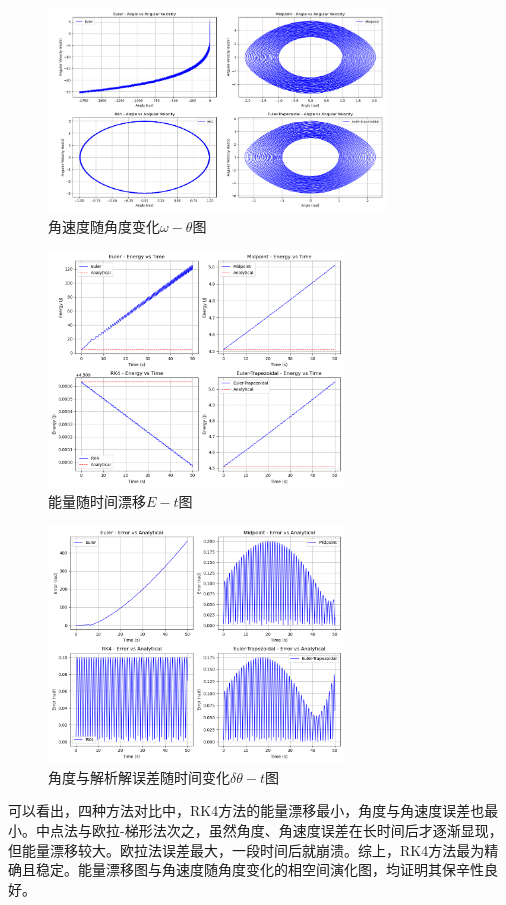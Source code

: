 \begin{figure}[H]
    \centering
    \includegraphics[width=0.8\textwidth]{Problem_1/figs/angle_velocity_angle.png}
    \caption{角速度随角度变化$\omega - \theta $图}
\end{figure}
\begin{figure}[H]
    \centering
    \includegraphics[width=0.7\textwidth]{Problem_1/figs/energy_time.png}
    \caption{能量随时间漂移$E - t $图}
\end{figure}
\begin{figure}[H]
    \centering
    \includegraphics[width=0.7\textwidth]{Problem_1/figs/angle_error_time.png}
    \caption{角度与解析解误差随时间变化$\delta \theta - t $图}
\end{figure}
可以看出，四种方法对比中，RK4方法的能量漂移最小，角度与角速度误差也最小。中点法与欧拉-梯形法次之，虽然角度、角速度误差在长时间后才逐渐显现，但能量漂移较大。欧拉法误差最大，一段时间后就崩溃。综上，RK4方法最为精确且稳定。能量漂移图与角速度随角度变化的相空间演化图，均证明其保辛性良好。